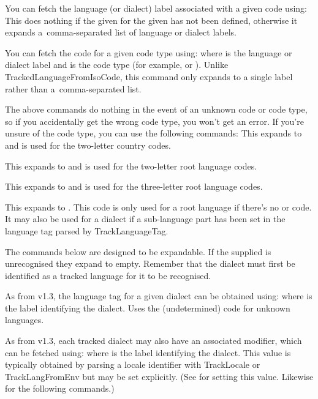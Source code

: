 \documentclass[titlepage=false,oneside,
 fontsize=12pt,captions=tableheading]{scrbook}
\begin{document}
You can fetch the language (or dialect) label associated with a
given  code using:
This does nothing if the given  for the given 
 has not been defined, otherwise it expands
a~comma-separated list of language or dialect labels.

You can fetch the  code for a given code type using:
where  is the language or dialect label and  is the  code type (for example,  or
). Unlike \gls{TrackedLanguageFromIsoCode}, this
command only expands to a single label rather than a~comma-separated
list.

The above commands do nothing in the event of an unknown code or
code type,
so if you accidentally get the wrong code type, you won't get an error.
If you're unsure of the code type, you can use the following commands:
This expands to  and is used for the two-letter country codes.

This expands to  and is used for the two-letter root language codes.

This expands to  and is used for the three-letter root language
codes.

This expands to . This code is only used for a root language if 
there's no  or  code. It may also be used for a
dialect if a sub-language part has been set in the language
tag parsed by \gls{TrackLanguageTag}.

The  commands below are designed to be expandable.
If the supplied  is unrecognised they expand to empty.
Remember that the dialect must first be identified as a tracked 
language for it to be recognised.

As from v1.3, the language tag for a given dialect can be obtained
using:
where  is the label identifying the dialect.
Uses the  (undetermined) code for unknown languages.

As from v1.3, each tracked dialect may also have an associated 
modifier, which can be fetched using:
where  is the label identifying the dialect.
This value is typically obtained by parsing a  locale identifier
with \gls{TrackLocale} or \gls{TrackLangFromEnv} but may be set explicitly.
(See  for setting this value. Likewise for
the following commands.)
\end{document}
